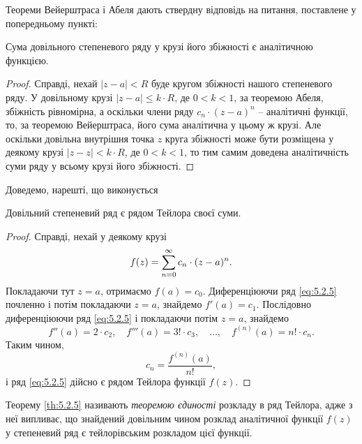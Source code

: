 Теореми Вейерштраса і Абеля дають ствердну відповідь на питання, поставлене у попередньому пункті:
\begin{theorem}
	Сума довільного степеневого ряду у крузі його збіжності є аналітичною функцією.
\end{theorem}
\begin{proof}
	Справді, нехай $|z - a| < R$ буде кругом збіжності нашого степеневого ряду. У довільному крузі $|z - a| \le k \cdot R$, де $0 < k < 1$, за теоремою Абеля, збіжність рівномірна, а оскільки члени ряду $c_n \cdot (z - a)^n$ -- аналітичні функції, то, за теоремою Вейерштраса, його сума аналітична у цьому ж крузі. Але оскільки довільна внутрішня точка $z$ круга збіжності може бути розміщена у деякому крузі $|z - z| < k \cdot R$, де $0 < k < 1$, то тим самим доведена аналітичність суми ряду у всьому крузі його збіжності.
\end{proof}

Доведемо, нарешті, що виконується
\begin{theorem}
	\label{th:5.2.5}
	Довільний степеневий ряд є рядом Тейлора своєї суми.
\end{theorem}
\begin{proof}
	Справді, нехай у деякому крузі
	\begin{equation}
		\label{eq:5.2.5}
		f(z) = \displaystyle\sum\limits_{n = 0}^\infty c_n \cdot (z - a)^n.
	\end{equation}
	Покладаючи тут $z = a$, отримаємо $f(a) = c_0$. Диференціюючи ряд \eqref{eq:5.2.5} %
	почленно і потім покладаючи $z = a$, знайдемо $f'(a) = c_1$. Послідовно диференціюючи ряд \eqref{eq:5.2.5} %
	і покладаючи потім $z = a$, знайдемо
	\begin{equation*}
		f''(a) = 2 \cdot c_2, \quad f'''(a) = 3! \cdot c_3,  \quad \ldots, \quad f^{(n)}(a) = n! \cdot c_n.
	\end{equation*}
	Таким чином, 
	\begin{equation}
		\label{eq:5.2.6}
		c_n = \frac{f^{(n)}(a)}{n!},
	\end{equation}
	і ряд \eqref{eq:5.2.5} %
	дійсно є рядом Тейлора функції $f(z)$.
\end{proof}

Теорему \ref{th:5.2.5} називають \textit{теоремою єдиності} розкладу в ряд Тейлора, адже з неї випливає, що знайдений довільним чином розклад аналітичної функції $f(z)$ у степеневий ряд є тейлорівським розкладом цієї функції. \\

